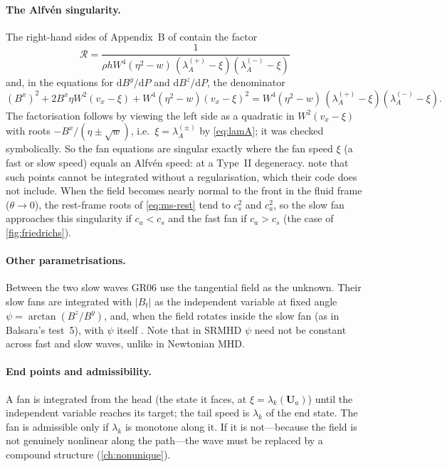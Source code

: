 \documentclass[11pt,a4paper,oneside,openany]{book}
\newcommand{\textcite}{\citet}
\newcommand{\parencite}{\citep}
\theoremstyle{definition}
\theoremstyle{plain}
\theoremstyle{remark}
\newcommand{\dd}{\mathrm{d}}
\newcommand{\UU}{\bm{U}}
\newcommand{\Ptot}{P}
\newcommand{\vB}{\eta}
\begin{document}
\paragraph{The Alfvén singularity.} The right-hand sides of Appendix~B of
\textcite{GiacomazzoRezzolla2006} contain the factor
\begin{equation}
\mathcal R=\frac{1}{\rho hW^4(\vB^2-w)\,(\lambda_A^{(+)}-\xi)(\lambda_A^{(-)}-\xi)}
\end{equation}
and, in the equations for $\dd B^y/\dd\Ptot$ and $\dd B^z/\dd\Ptot$, the denominator
\begin{equation}\label{eq:Bydenom}
(B^x)^2+2B^x\vB W^2(v_x-\xi)+W^4(\vB^2-w)(v_x-\xi)^2
=W^4(\vB^2-w)\,(\lambda_A^{(+)}-\xi)(\lambda_A^{(-)}-\xi).
\end{equation}
The factorisation follows by viewing the left side as a quadratic in $W^2(v_x-\xi)$ with
roots $-B^x/(\vB\pm\sqrt w)$, i.e.\ $\xi=\lambda_A^{(\pm)}$ by \eqref{eq:lamA}; it was
checked symbolically. So the fan equations are singular exactly where the fan speed
$\xi$ (a fast or slow speed) equals an Alfvén speed: at a Type~II degeneracy.
\textcite{GiacomazzoRezzolla2006} note that such points cannot be integrated without a
regularisation, which their code does not include. When the field becomes nearly normal
to the front in the fluid frame ($\theta\to0$), the rest-frame roots of \eqref{eq:ms-rest}
tend to $c_s^2$ and $c_a^2$, so the slow fan approaches this singularity if $c_a<c_s$ and the
fast fan if $c_a>c_s$ (the case of \cref{fig:friedrichs}).

\paragraph{Other parametrisations.} Between the two slow waves GR06 use the tangential field
as the unknown. Their slow fans are integrated with $|B_t|$ as the independent variable at
fixed angle $\psi=\arctan(B^z/B^y)$, and, when the field rotates inside the slow fan (as in
Balsara's test~5), with $\psi$ itself \parencite[\S5.2]{GiacomazzoRezzolla2006}. Note that
in SRMHD $\psi$ need not be constant across fast and slow waves, unlike in Newtonian MHD.

\paragraph{End points and admissibility.} A fan is integrated from the head (the state
it faces, at $\xi=\lambda_k(\UU_a)$) until the independent variable reaches its target; the
tail speed is $\lambda_k$ of the end state. The fan is admissible only if $\lambda_k$ is
monotone along it. If it is not---because the field is not genuinely nonlinear along the
path---the wave must be replaced by a compound structure (\cref{ch:nonunique}).
\end{document}
